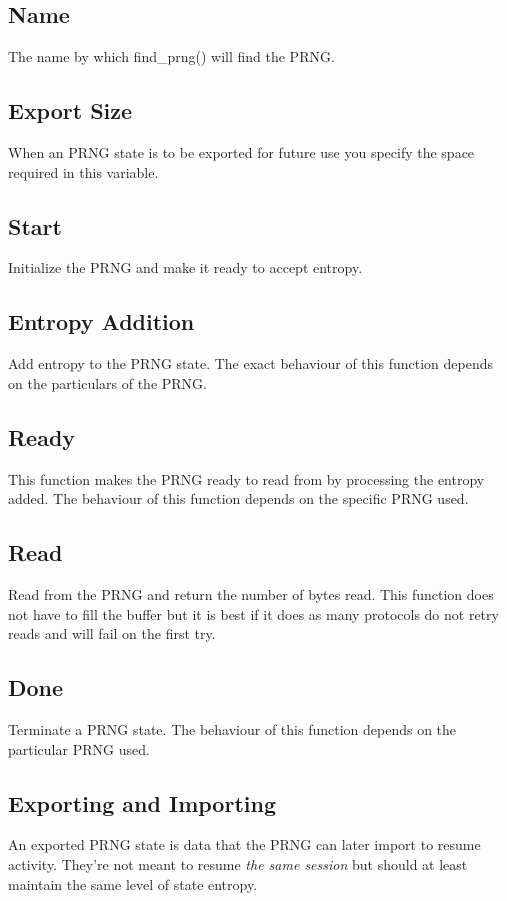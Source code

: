 \documentclass[synpaper]{book}
\begin{document}
\subsection{Name}
The name by which find\_prng() will find the PRNG.

\subsection{Export Size}
When an PRNG state is to be exported for future use you specify the space required in this variable.

\subsection{Start}
Initialize the PRNG and make it ready to accept entropy.

\subsection{Entropy Addition}
Add entropy to the PRNG state.  The exact behaviour of this function depends on the particulars of the PRNG.

\subsection{Ready}
This function makes the PRNG ready to read from by processing the entropy added.  The behaviour of this function depends
on the specific PRNG used.

\subsection{Read}
Read from the PRNG and return the number of bytes read.  This function does not have to fill the buffer but it is best
if it does as many protocols do not retry reads and will fail on the first try.

\subsection{Done}
Terminate a PRNG state.  The behaviour of this function depends on the particular PRNG used.

\subsection{Exporting and Importing}
An exported PRNG state is data that the PRNG can later import to resume activity.  They're not meant to resume \textit{the same session}
but should at least maintain the same level of state entropy.
\end{document}
